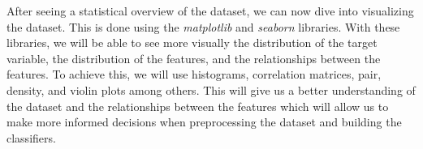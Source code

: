 After seeing a statistical overview of the dataset, we can now dive into visualizing the dataset. This is done using the \textit{matplotlib} and \textit{seaborn} libraries. With these libraries, we will be able to see more visually the distribution of the target variable, the distribution of the features, and the relationships between the features. To achieve this, we will use histograms, correlation matrices, pair, density, and violin plots among others. This will give us a better understanding of the dataset and the relationships between the features which will allow us to make more informed decisions when preprocessing the dataset and building the classifiers.